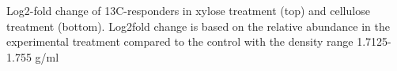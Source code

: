 Log2-fold change of 13C-responders in xylose treatment (top) and cellulose treatment (bottom). Log2fold change is based on the relative abundance in the experimental treatment compared to the control with the density range 1.7125-1.755 g/ml
